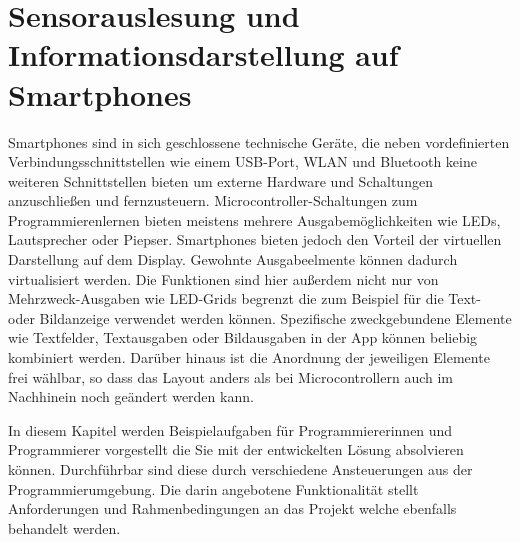 \documentclass[11pt,a4paper]{report}
\begin{document}
\chapter{Sensorauslesung und Informationsdarstellung auf Smartphones} \label{chap:Experimente}
Smartphones sind in sich geschlossene technische Geräte, die neben vordefinierten Verbindungsschnittstellen wie einem USB-Port, WLAN und Bluetooth keine weiteren Schnittstellen bieten um externe Hardware und Schaltungen anzuschließen und fernzusteuern.
Microcontroller-Schaltungen zum Programmierenlernen bieten meistens mehrere Ausgabemöglichkeiten wie LEDs, Lautsprecher oder Piepser.
Smartphones bieten jedoch den Vorteil der virtuellen Darstellung auf dem Display.
Gewohnte Ausgabeelmente können dadurch virtualisiert werden.
Die Funktionen sind hier außerdem nicht nur von Mehrzweck-Ausgaben wie LED-Grids begrenzt die zum Beispiel für die Text- oder Bildanzeige verwendet werden können.
Spezifische zweckgebundene Elemente wie Textfelder, Textausgaben oder Bildausgaben in der App können beliebig kombiniert werden.
Darüber hinaus ist die Anordnung der jeweiligen Elemente frei wählbar, so dass das Layout anders als bei Microcontrollern auch im Nachhinein noch geändert werden kann.

In diesem Kapitel werden Beispielaufgaben für Programmiererinnen und Programmierer vorgestellt die Sie mit der entwickelten Lösung absolvieren können.
Durchführbar sind diese durch verschiedene Ansteuerungen aus der Programmierumgebung.
Die darin angebotene Funktionalität stellt Anforderungen und Rahmenbedingungen an das Projekt welche ebenfalls behandelt werden.
\end{document}
